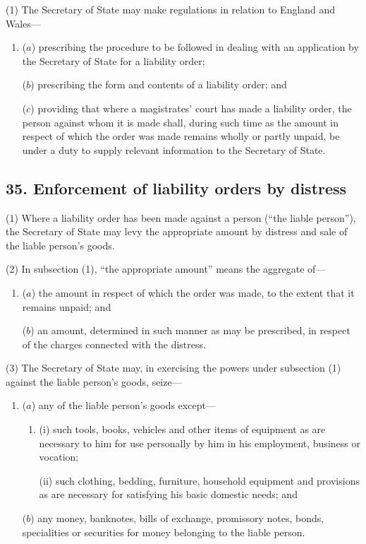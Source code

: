 \documentclass[12pt,a4paper]{article}
\begin{document}
(1) The Secretary of State may make regulations in relation to England and Wales---
\begin{enumerate}\item[]
($a$)
prescribing the procedure to be followed in dealing with an application by the Secretary of State for a liability order;

($b$)
prescribing the form and contents of a liability order; and

($c$)
providing that where a magistrates’ court has made a liability order, the person against whom it is made shall, during such time as the amount in respect of which the order was made remains wholly or partly unpaid, be under a duty to supply relevant information to the Secretary of State.
\end{enumerate}


\subsection{35. Enforcement of liability orders by distress}

(1) Where a liability order has been made against a person (“the liable person”), the Secretary of State may levy the appropriate amount by distress and sale of the liable person’s goods.

(2) In subsection (1), “the appropriate amount” means the aggregate of---
\begin{enumerate}\item[]
($a$)
the amount in respect of which the order was made, to the extent that it remains unpaid; and

($b$)
an amount, determined in such manner as may be prescribed, in respect of the charges connected with the distress.
\end{enumerate}

(3) The Secretary of State may, in exercising the powers under subsection (1) against the liable person’s goods, seize---
\begin{enumerate}\item[]
($a$)
any of the liable person’s goods except---
\begin{enumerate}\item[]
(i) such tools, books, vehicles and other items of equipment as are necessary to him for use personally by him in his employment, business or vocation;

(ii) such clothing, bedding, furniture, household equipment and provisions as are necessary for satisfying his basic domestic needs; and
\end{enumerate}
($b$)
any money, banknotes, bills of exchange, promissory notes, bonds, specialities or securities for money belonging to the liable person.
\end{enumerate}
\end{document}
